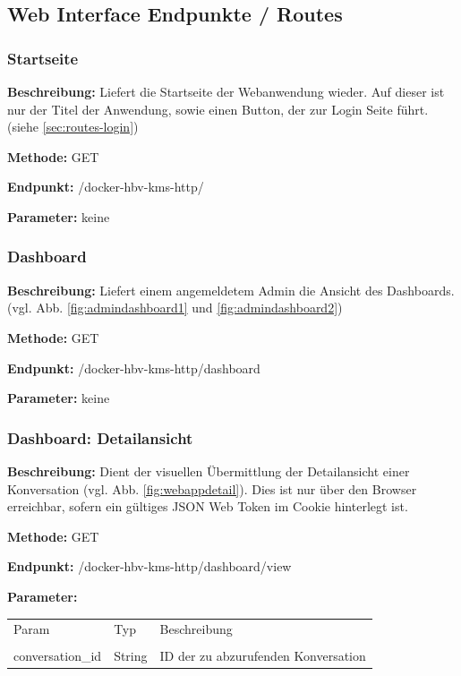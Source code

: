 \subsection{Web Interface Endpunkte / Routes}
\label{sec:routes}
\dotfill
\subsubsection{Startseite}
\label{sec:routes-start}
\textbf{Beschreibung:} Liefert die Startseite der Webanwendung wieder. Auf dieser ist nur der Titel der Anwendung,
sowie einen Button, der zur Login Seite führt. (siehe \ref{sec:routes-login})

\textbf{Methode:} GET

\textbf{Endpunkt:} /docker-hbv-kms-http/

\textbf{Parameter:}
keine

\dotfill

\subsubsection{Dashboard}
\label{sec:routes-dashboard}
\textbf{Beschreibung:} Liefert einem angemeldetem Admin die Ansicht des Dashboards.
(vgl. Abb. \ref{fig:admindashboard1} und \ref{fig:admindashboard2})

\textbf{Methode:} GET

\textbf{Endpunkt:} /docker-hbv-kms-http/dashboard

\textbf{Parameter:}
keine

\dotfill

\subsubsection{Dashboard: Detailansicht}
\label{sec:routes-dashboard-detail}
\textbf{Beschreibung:} Dient der visuellen Übermittlung der Detailansicht einer Konversation (vgl. Abb. \ref{fig:webappdetail}).
Dies ist nur über den Browser erreichbar, sofern ein gültiges JSON Web Token im Cookie hinterlegt ist.

\textbf{Methode:} GET

\textbf{Endpunkt:} /docker-hbv-kms-http/dashboard/view

\textbf{Parameter:}
\begin{table}[H]
    \label{table:/docker-hbv-kms-http/dashboard/view}
    \setlength{\tabcolsep}{3pt}
    \begin{tabular}{p{100pt}p{80pt}p{200pt}}
        \toprule
        Param            & Typ    & Beschreibung                        \\                                                             \\
        \midrule
        conversation\_id & String & ID der zu abzurufenden Konversation \\
        \bottomrule
    \end{tabular}
\end{table}
\dotfill

